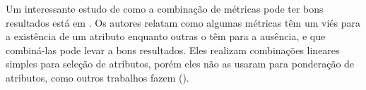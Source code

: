 
%
% 
%

    
Um interessante estudo de como a combinação de métricas pode ter bons resultados está em \cite{Tang05}. Os autores relatam como algumas métricas têm um viés para a existência de um atributo enquanto outras o têm para a ausência, e que combiná-las pode levar a bons resultados. 
Eles realizam combinações lineares simples para seleção de atributos, porém eles não as usaram para ponderação de atributos, como outros trabalhos fazem (\cite{Debole03}).    

